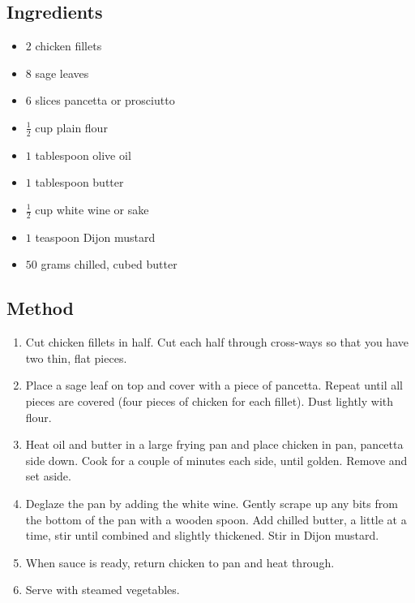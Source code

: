 \documentclass[11pt,a4paper]{article}
\begin{document}
\subsection*{Ingredients}

\begin{multicols}{2}

\begin{itemize}
   \item $ 2 $ chicken fillets
   \item $ 8 $ sage leaves
   \item $ 6 $ slices pancetta or prosciutto
   \item $ \frac {1} {2} $ cup plain flour
\end{itemize}

\columnbreak

\begin{itemize}
   \item $ 1 $ tablespoon olive oil
   \item $ 1 $ tablespoon butter
   \item $ \frac {1} {2} $ cup white wine or sake
   \item $ 1 $ teaspoon Dijon mustard
   \item $ 50 $ grams chilled, cubed butter
\end{itemize}

\end{multicols}

\medskip

\subsection*{Method}

\begin{enumerate}
   \item Cut chicken fillets in half. Cut each half through cross-ways so that you have two thin, flat pieces.
   \item Place a sage leaf on top and cover with a piece of pancetta. 
         Repeat until all pieces are covered (four pieces of chicken for each fillet). 
         Dust lightly with flour.
   \item Heat oil and butter in a large frying pan and place chicken in pan, pancetta side down.
         Cook for a couple of minutes each side, until golden.
         Remove and set aside.
   \item Deglaze the pan by adding the white wine. Gently scrape up any bits from the bottom of the pan with a wooden spoon.
         Add chilled butter, a little at a time, stir until combined and slightly thickened. Stir in Dijon mustard.
   \item When sauce is ready, return chicken to pan and heat through.
   \item Serve with steamed vegetables.
\end{enumerate}

\end{document}
